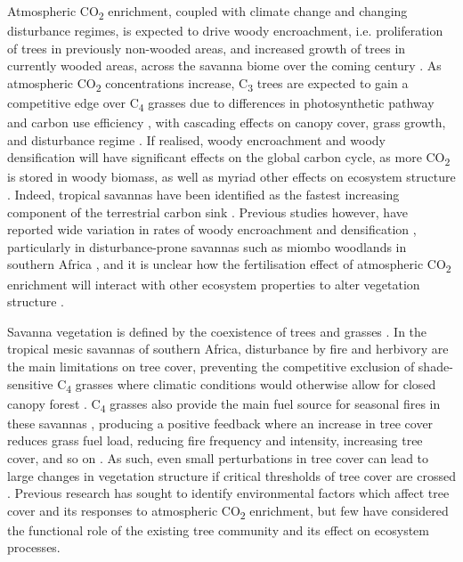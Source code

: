 \documentclass[11pt,a4paper]{article}
\begin{document}
Atmospheric CO\textsubscript{2} enrichment, coupled with climate change and changing disturbance regimes, is expected to drive woody encroachment, i.e. proliferation of trees in previously non-wooded areas, and increased growth of trees in currently wooded areas, across the savanna biome over the coming century \citep{Criado2020, Stevens2016, Mitchard2013}. As atmospheric CO\textsubscript{2} concentrations increase, C\textsubscript{3} trees are expected to gain a competitive edge over C\textsubscript{4} grasses due to differences in photosynthetic pathway and carbon use efficiency \citep{Buitenwerf2012}, with cascading effects on canopy cover, grass growth, and disturbance regime \citep{Bond2012}. If realised, woody encroachment and woody densification will have significant effects on the global carbon cycle, as more CO\textsubscript{2} is stored in woody biomass, as well as myriad other effects on ecosystem structure \citep{Donohue2013}. Indeed, tropical savannas have been identified as the fastest increasing component of the terrestrial carbon sink \citep{Sitch2015}. Previous studies however, have reported wide variation in rates of woody encroachment and densification \citep{Mitchard2013}, particularly in disturbance-prone savannas such as miombo woodlands in southern Africa \citep{Axelsson2018}, and it is unclear how the fertilisation effect of atmospheric CO\textsubscript{2} enrichment will interact with other ecosystem properties to alter vegetation structure \citep{Korner2017, Reich2014}.

Savanna vegetation is defined by the coexistence of trees and grasses \citep{Scholes1997}. In the tropical mesic savannas of southern Africa, disturbance by fire and herbivory are the main limitations on tree cover, preventing the competitive exclusion of shade-sensitive C\textsubscript{4} grasses where climatic conditions would otherwise allow for closed canopy forest \citep{Sankaran2005}. C\textsubscript{4} grasses also provide the main fuel source for seasonal fires in these savannas \citep{Frost1996}, producing a positive feedback where an increase in tree cover reduces grass fuel load, reducing fire frequency and intensity, increasing tree cover, and so on \citep{Staver2015}. As such, even small perturbations in tree cover can lead to large changes in vegetation structure if critical thresholds of tree cover are crossed \citep{Hirota2011}. Previous research has sought to identify environmental factors which affect tree cover and its responses to atmospheric CO\textsubscript{2} enrichment, but few have considered the functional role of the existing tree community and its effect on ecosystem processes.
\end{document}
